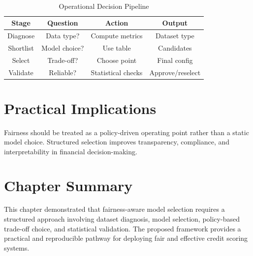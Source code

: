\paragraph{}
\begin{table}[h]
\centering
\caption{Operational Decision Pipeline}
\renewcommand{\arraystretch}{1.3}
\begin{tabular}{|c|c|c|c|}
\hline
Stage & Question & Action & Output \\ \hline
Diagnose & Data type? & Compute metrics & Dataset type \\ \hline
Shortlist & Model choice? & Use table & Candidates \\ \hline
Select & Trade-off? & Choose point & Final config \\ \hline
Validate & Reliable? & Statistical checks & Approve/reselect \\ \hline
\end{tabular}
\end{table}

\section{Practical Implications}
\paragraph{}
Fairness should be treated as a policy-driven operating point rather than a static model choice. Structured selection improves transparency, compliance, and interpretability in financial decision-making.

\section{Chapter Summary}
\paragraph{}
This chapter demonstrated that fairness-aware model selection requires a structured approach involving dataset diagnosis, model selection, policy-based trade-off choice, and statistical validation. The proposed framework provides a practical and reproducible pathway for deploying fair and effective credit scoring systems.